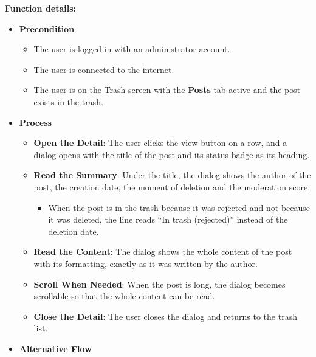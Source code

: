 \textbf{Function details:}
\begin{itemize}[leftmargin=1.6em,topsep=4pt,itemsep=3pt,parsep=0pt,label=$\bullet$]
    \item \textbf{Precondition}
        \begin{itemize}[leftmargin=2.2em,topsep=2pt,itemsep=3pt,parsep=0pt,label=$\circ$]
            \item The user is logged in with an administrator account.
            \item The user is connected to the internet.
            \item The user is on the Trash screen with the \textbf{Posts} tab active and the post exists in the trash.
        \end{itemize}
    \item \textbf{Process}
        \begin{itemize}[leftmargin=2.2em,topsep=2pt,itemsep=3pt,parsep=0pt,label=$\circ$]
            \item \textbf{Open the Detail}: The user clicks the view button on a row, and a dialog opens with the title of the post and its status badge as its heading.
            \item \textbf{Read the Summary}: Under the title, the dialog shows the author of the post, the creation date, the moment of deletion and the moderation score.
                \begin{itemize}[leftmargin=2.2em,topsep=2pt,itemsep=3pt,parsep=0pt,label=$\blacksquare$]
                    \item When the post is in the trash because it was rejected and not because it was deleted, the line reads ``In trash (rejected)'' instead of the deletion date.
                \end{itemize}
            \item \textbf{Read the Content}: The dialog shows the whole content of the post with its formatting, exactly as it was written by the author.
            \item \textbf{Scroll When Needed}: When the post is long, the dialog becomes scrollable so that the whole content can be read.
            \item \textbf{Close the Detail}: The user closes the dialog and returns to the trash list.
        \end{itemize}
    \item \textbf{Alternative Flow}
        \begin{itemize}[leftmargin=2.2em,topsep=2pt,itemsep=3pt,parsep=0pt,label=$\circ$]

\end{itemize}
\end{itemize}

